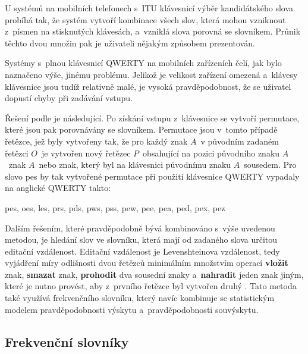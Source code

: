 \documentclass[a4paper,11pt,openany]{book} %
\newcommand\exmp{\textsf}
\begin{document}
U systémů na mobilních telefonech s~ITU klávesnicí výběr kandidátského slova probíhá tak, že systém vytvoří kombinace všech slov, která mohou vzniknout z~písmen na stisknutých klávesách, a~vzniklá slova porovná se slovníkem. Průnik těchto dvou množin pak je uživateli nějakým způsobem prezentován. 

Systémy s~plnou klávesnicí QWERTY na mobilních zařízeních čelí, jak bylo naznačeno výše, jinému problému. Jelikož je velikost zařízení omezená a~klávesy klávesnice jsou tudíž relativně malé, je vysoká pravděpodobnost, že se uživatel dopustí chyby při zadávání vstupu. \parencite{kocienda2012method} %

Řešení podle \parencite{kocienda2012method} je následující. Po získání vstupu z~klávesnice se vytvoří permutace, které jsou pak porovnávány se slovníkem. Permutace jsou v~tomto případě řetězce, jež byly vytvořeny tak, že pro každý znak $A$~v původním zadaném řetězci $O$~je vytvořen nový řetězec $P$~obsahující na pozici původního znaku $A$~znak $A$~nebo znak, který byl na klávesnici původnímu znaku $A$~sousedem. Pro slovo \exmp{pes} by tak vytvořené permutace při použití klávesnice QWERTY vypadaly na anglické QWERTY takto: %

\begin{center} 
	\exmp{pes, oes, les, prs, pds, pws, pss, pew, pee, pea, ped, pex, pez}
\end{center}

Dalším řešením, které pravděpodobně bývá kombinováno s~výše uvedenou metodou, je hledání slov ve slovníku, která mají od zadaného slova určitou editační vzdálenost. Editační vzdálenost je Levenshteinova vzdálenost, tedy vyjádření míry odlišnosti dvou řetězců minimálním množstvím operací {\bf vložit} znak, {\bf smazat} znak, {\bf prohodit} dva sousední znaky a~{\bf nahradit} jeden znak jiným, které je nutno provést, aby z~prvního řetězce byl vytvořen druhý \parencite{levenshtein-en1966}. \nocite{levenshtein1965}  %
Tato metoda také využívá frekvenčního slovníku, který navíc kombinuje se statistickým modelem pravděpodobnosti výskytu a~pravděpodobnosti souvýskytu. \parencite{peternorvig} %

\subsection{Frekvenční slovníky}\label{frecdic}
\end{document}
